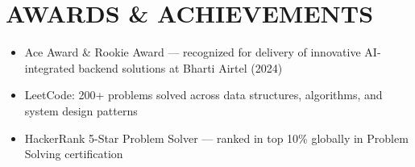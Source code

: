 \documentclass[10.5pt,a4paper]{article}
\newenvironment{bul}{\begin{itemize}[leftmargin=2.2em,itemsep=2pt,topsep=2pt,parsep=0pt,label=\textbullet]}{\end{itemize}}
\begin{document}
\section{AWARDS \& ACHIEVEMENTS}
\begin{bul}
\item Ace Award \& Rookie Award --- recognized for delivery of innovative AI-integrated backend solutions at Bharti Airtel (2024)
\item LeetCode: 200+ problems solved across data structures, algorithms, and system design patterns
\item HackerRank 5-Star Problem Solver --- ranked in top 10\% globally in Problem Solving certification
\end{bul}
\end{document}
